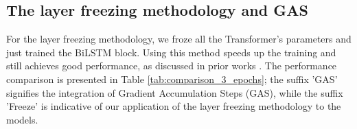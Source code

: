\subsection{The layer freezing methodology and GAS}

For the layer freezing methodology, we froze all the Transformer's parameters and just trained the BiLSTM block. Using this method speeds up the training and still achieves good performance, as discussed in prior works \cite{merchant2020happens,lee2019would,kovaleva2019revealing}. The performance comparison is presented in Table \ref{tab:comparison_3_epochs}; the suffix 'GAS' signifies the integration of Gradient Accumulation Steps (GAS), while the suffix 'Freeze' is indicative of our application of the layer freezing methodology to the models.

\begin{figure}[h]
	\centering
	
	
	

\end{figure}
